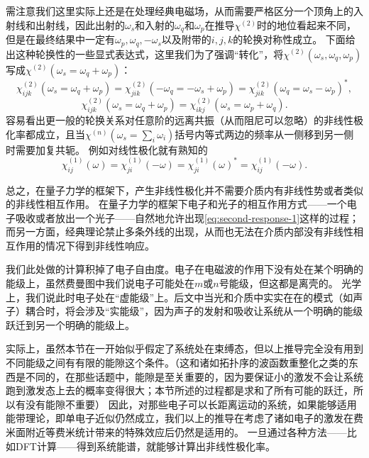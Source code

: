 需注意我们这里实际上还是在处理经典电磁场，从而需要严格区分一个顶角上的入射线和出射线，因此出射的$\omega_s$和入射的$\omega_q$和$\omega_p$在推导$\chi^{(2)}$时的地位看起来不同，但是在最终结果中一定有$\omega_p, \omega_q, -\omega_s$以及附带的$i, j, k$的轮换对称性成立。
下面给出这种轮换性的一些显式表达式，这里我们为了强调“转化”，将$\chi^{(2)}(\omega_s, \omega_q, \omega_p)$写成$\chi^{(2)}(\omega_s = \omega_q + \omega_p)$：
\begin{equation}
    \chi^{(2)}_{ijk}(\omega_s = \omega_q + \omega_p) = \chi^{(2)}_{jik}(- \omega_q = - \omega_s + \omega_p) = \chi^{(2)}_{jik}(\omega_q = \omega_s - \omega_p)^*, 
\end{equation}
\begin{equation}
    \chi^{(2)}_{ijk}(\omega_s = \omega_q + \omega_p) = \chi^{(2)}_{ikj}(\omega_s = \omega_p + \omega_q).
\end{equation}
容易看出更一般的轮换关系对任意阶的远离共振（从而阻尼可以忽略）的非线性极化率都成立，且当$\chi^{(n)}(\omega_s = \sum_i \omega_i)$括号内等式两边的频率从一侧移到另一侧时需要加复共轭。
例如对线性极化就有熟知的
\begin{equation}
    \chi^{(1)}_{ij}(\omega) = \chi^{(1)}_{ji}(-\omega) = \chi^{(1)}_{ji}(\omega)^* = \chi^{(1)}_{ij}(-\omega).
\end{equation}

总之，在量子力学的框架下，产生非线性极化并不需要介质内有非线性势或者类似的非线性相互作用。
在量子力学的框架下电子和光子的相互作用方式——一个电子吸收或者放出一个光子——自然地允许出现\eqref{eq:second-response-1}这样的过程；而另一方面，经典理论禁止多条外线的出现，从而也无法在介质内部没有非线性相互作用的情况下得到非线性响应。

我们此处做的计算积掉了电子自由度。电子在电磁波的作用下没有处在某个明确的能级上，虽然费曼图中我们说电子可能处在$m$或$n$号能级，但这都是离壳的。
光学上，我们说此时电子处在“虚能级”上。后文中当光和介质中实实在在的模式（如声子）耦合时，将会涉及“实能级”，因为声子的发射和吸收让系统从一个明确的能级跃迁到另一个明确的能级上。

实际上，虽然本节在一开始似乎假定了系统处在束缚态，但以上推导完全没有用到不同能级之间有有限的能隙这个条件。（这和诸如拓扑序的波函数重整化之类的东西是不同的，在那些话题中，能隙是至关重要的，因为要保证小的激发不会让系统跑到激发态上去的概率变得很大；本节所述的过程都是求和了所有可能的跃迁，所以有没有能隙不重要）
因此，对那些电子可以长距离运动的系统，如果能够适用能带理论，即单电子近似仍然成立，我们以上的推导在考虑了诸如电子的激发在费米面附近等费米统计带来的特殊效应后仍然是适用的。
一旦通过各种方法——比如DFT计算——得到系统能谱，就能够计算出非线性极化率。

